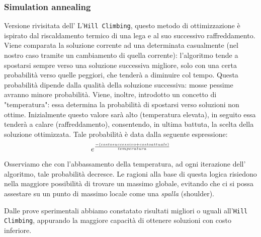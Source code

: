			\subsubsection{Simulation annealing}
				Versione rivisitata dell' L'\texttt{Hill Climbing}, questo metodo di ottimizzazione è ispirato dal riscaldamento termico di una lega e al suo successivo raffreddamento. Viene comparata la soluzione corrente ad una determinata casualmente (nel nostro caso tramite un cambiamento di quella corrente): l'algoritmo tende a spostarsi sempre verso una soluzione successiva migliore, solo con una certa probabilità verso quelle peggiori, che tenderà a diminuire col tempo. Questa probabilità dipende dalla qualità della soluzione successiva: mosse pessime avranno minore probabilità. Viene, inoltre, introdotto un concetto di "temperatura": essa determina la probabilità di spostarsi verso soluzioni non ottime. Inizialmente questo valore sarà alto (temperatura elevata), in seguito essa tenderà a calare (raffreddamento), consentendo, in ultima battuta, la scelta della soluzione ottimizzata. Tale probabilità è data dalla seguente espressione:
				\begin{equation*}
				{\LARGE e^{\frac{-(costosuccessivo+costoattuale)}{temperatura}}}
				\end{equation*}
				Osserviamo che con l'abbassamento della temperatura, ad ogni iterazione dell' algoritmo, tale probabilità decresce.
				Le ragioni alla base di questa logica risiedono nella maggiore possibilità di trovare un massimo globale, evitando che ci si possa assestare su un punto di massimo locale come una \emph{spalla} (shoulder).\par
				Dalle prove sperimentali abbiamo constatato risultati migliori o uguali all'\texttt{Hill Climbing}, appurando la maggiore capacità di ottenere soluzioni con costo inferiore.
				
